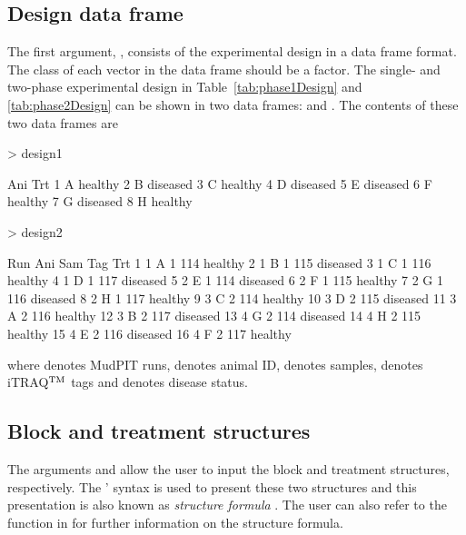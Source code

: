 \documentclass[article]{jss}
\begin{document}
\subsection{Design data frame}
The first argument, , consists of the experimental design in a data frame format. The class of each vector in the data frame should be a factor. The single- and two-phase experimental design in Table~\ref{tab:phase1Design} and \ref{tab:phase2Design} can be shown in two data frames:  and . The contents of these two data frames are
\begin{CodeChunk}
\begin{CodeInput}
> design1
\end{CodeInput}
\begin{CodeOutput}
  Ani      Trt
1   A  healthy
2   B diseased
3   C  healthy
4   D diseased
5   E diseased
6   F  healthy
7   G diseased
8   H  healthy
\end{CodeOutput}

\begin{CodeInput}
> design2
\end{CodeInput}
\begin{CodeOutput}
   Run Ani Sam Tag      Trt
1    1   A   1 114  healthy
2    1   B   1 115 diseased
3    1   C   1 116  healthy
4    1   D   1 117 diseased
5    2   E   1 114 diseased
6    2   F   1 115  healthy
7    2   G   1 116 diseased
8    2   H   1 117  healthy
9    3   C   2 114  healthy
10   3   D   2 115 diseased
11   3   A   2 116  healthy
12   3   B   2 117 diseased
13   4   G   2 114 diseased
14   4   H   2 115  healthy
15   4   E   2 116 diseased
16   4   F   2 117  healthy
\end{CodeOutput}
\end{CodeChunk}
where  denotes MudPIT runs,  denotes animal ID,  denotes samples,  denotes iTRAQ$^{\rm TM}$ tags and  denotes disease status.

\subsection{Block and treatment structures}
The arguments  and  allow the user to input the block and treatment structures, respectively. The \citeauthor{Wilkinson1973}' syntax is used to present these two structures and this presentation is also known as \emph{structure formula} \citep{Wilkinson1973}. The user can also refer to the  function in  for further information on the structure formula. 
 
\end{document}
